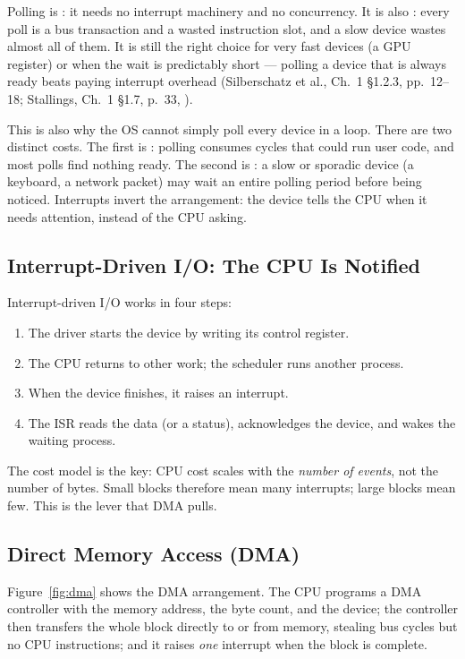 \documentclass[11pt]{article}
\begin{document}
Polling is : it needs no interrupt machinery and no concurrency. It is also : every poll is a bus transaction and a wasted instruction slot, and a slow device wastes almost all of them. It is still the right choice for very fast devices (a GPU register) or when the wait is predictably short --- polling a device that is always ready beats paying interrupt overhead (Silberschatz et al., Ch.~1 \S1.2.3, pp.~12--18; Stallings, Ch.~1 \S1.7, p.~33, \cite{StallingsOS_internals_design_principles}).

This is also why the OS cannot simply poll every device in a loop. There are two distinct costs. The first is : polling consumes cycles that could run user code, and most polls find nothing ready. The second is : a slow or sporadic device (a keyboard, a network packet) may wait an entire polling period before being noticed. Interrupts invert the arrangement: the device tells the CPU when it needs attention, instead of the CPU asking.

\subsection{Interrupt-Driven I/O: The CPU Is Notified}

Interrupt-driven I/O works in four steps:

\begin{enumerate}
  \item The driver starts the device by writing its control register.
  \item The CPU returns to other work; the scheduler runs another process.
  \item When the device finishes, it raises an interrupt.
  \item The ISR reads the data (or a status), acknowledges the device, and wakes the waiting process.
\end{enumerate}

The cost model is the key: CPU cost scales with the \emph{number of events}, not the number of bytes. Small blocks therefore mean many interrupts; large blocks mean few. This is the lever that DMA pulls.

\subsection{Direct Memory Access (DMA)}

Figure~\ref{fig:dma} shows the DMA arrangement. The CPU programs a DMA controller with the memory address, the byte count, and the device; the controller then transfers the whole block directly to or from memory, stealing bus cycles but no CPU instructions; and it raises \emph{one} interrupt when the block is complete.
\end{document}
